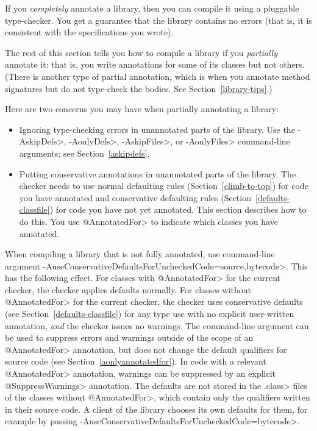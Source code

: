 
If you \emph{completely} annotate a library, then you can compile it using a
pluggable type-checker.  You get a guarantee that the library contains no
errors (that is, it is consistent with the specifications you wrote).

The rest of this section tells you how to compile a library if you
\emph{partially} annotate it:  that is, you write annotations for some of its
classes but not others.
(There is another type of partial annotation, which is when you annotate
method signatures but do not type-check the bodies.
See Section~\ref{library-tips}.)

Here are two concerns you may have when partially annotating a library:

\begin{itemize}
\item
  Ignoring type-checking errors in unannotated parts of the library.
  Use the \<-AskipDefs>, \<-AonlyDefs>, \<-AskipFiles>, or \<-AonlyFiles>
  command-line arguments; see
  Section~\ref{askipdefs}.

\item
  Putting conservative annotations in unannotated parts of the library.
  The checker needs to use normal defaulting rules
  (Section~\ref{climb-to-top}) for code you have annotated and conservative
  defaulting rules (Section~\ref{defaults-classfile}) for code you have not
  yet annotated.  This section describes how to do this.  You use
  \<@AnnotatedFor> to indicate which classes you have annotated.
\end{itemize}




\begin{sloppypar}
When compiling a library that is not fully annotated, use command-line
argument \<-AuseConservativeDefaultsForUncheckedCode=source,bytecode>.
This has the following effect.
For classes with \<@AnnotatedFor> for the current checker,
the checker applies defaults normally.
For classes without \<@AnnotatedFor> for the current checker,
the checker uses conservative defaults
(see Section~\ref{defaults-classfile}) for any type use with no explicit
user-written annotation, \emph{and} the checker issues no warnings.
The command-line argument  can be used to suppress
errors and warnings outside of the scope of an \<@AnnotatedFor> annotation,
but does not change the default qualifiers for source code (see
Section~\ref{aonlyannotatedfor}).
In code with a relevant \<@AnnotatedFor> annotation, warnings can be suppressed
by an explicit \<@SuppressWarnings> annotation.
The defaults are not stored in the \<.class> files of the classes without
\<@AnnotatedFor>, which contain only the qualifiers written in their source
code.  A client of the library chooses its own defaults for them, for example
by passing \<-AuseConservativeDefaultsForUncheckedCode=bytecode>.
\end{sloppypar}

